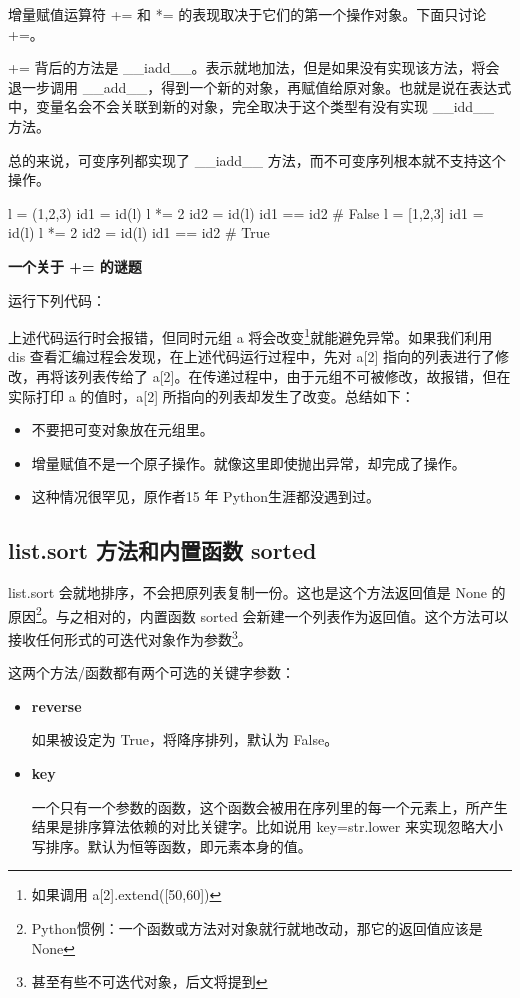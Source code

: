 增量赋值运算符 += 和 *= 的表现取决于它们的第一个操作对象。下面只讨论 +=。

+= 背后的方法是 \_\_iadd\_\_。表示就地加法，但是如果没有实现该方法，将会退一步调用 \_\_add\_\_，得到一个新的对象，再赋值给原对象。也就是说在表达式中，变量名会不会关联到新的对象，完全取决于这个类型有没有实现 \_\_idd\_\_ 方法。

总的来说，可变序列都实现了 \_\_iadd\_\_ 方法，而不可变序列根本就不支持这个操作。

\begin{python}
l = (1,2,3)
id1 = id(l)
l *= 2
id2 = id(l)
id1 == id2          # False
l = [1,2,3]
id1 = id(l)
l *= 2
id2 = id(l)
id1 == id2          # True
\end{python}

\textbf{一个关于 += 的谜题}

运行下列代码：



上述代码运行时会报错，但同时元组 a 将会改变\footnote{如果调用 a[2].extend([50,60])}就能避免异常。如果我们利用 dis 查看汇编过程会发现，在上述代码运行过程中，先对 a[2] 指向的列表进行了修改，再将该列表传给了 a[2]。在传递过程中，由于元组不可被修改，故报错，但在实际打印 a 的值时，a[2] 所指向的列表却发生了改变。总结如下：

\begin{itemize}
    \item 不要把可变对象放在元组里。
    \item 增量赋值不是一个原子操作。就像这里即使抛出异常，却完成了操作。
    \item 这种情况很罕见，原作者15 年 Python生涯都没遇到过。
\end{itemize}

\subsection{list.sort 方法和内置函数 sorted}

list.sort 会就地排序，不会把原列表复制一份。这也是这个方法返回值是 None 的原因\footnote{Python惯例：一个函数或方法对对象就行就地改动，那它的返回值应该是 None}。与之相对的，内置函数 sorted 会新建一个列表作为返回值。这个方法可以接收任何形式的可迭代对象作为参数\footnote{甚至有些不可迭代对象，后文将提到}。

这两个方法/函数都有两个可选的关键字参数：
\begin{itemize}
    \item \textbf{reverse}
    
    如果被设定为 True，将降序排列，默认为 False。
    
    \item \textbf{key}
    
    一个只有一个参数的函数，这个函数会被用在序列里的每一个元素上，所产生结果是排序算法依赖的对比关键字。比如说用 key=str.lower 来实现忽略大小写排序。默认为恒等函数，即元素本身的值。
\end{itemize}

